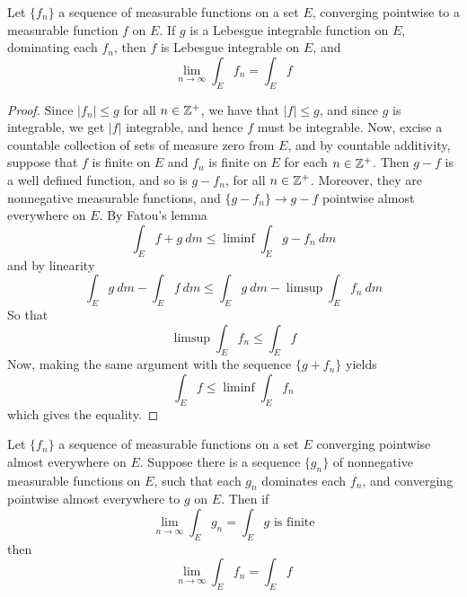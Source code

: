 \begin{theorem}\label{10.3.6}
    Let $\{f_n\}$ a sequence of measurable functions on a set $E$, converging
    pointwise to a measurable function  $f$ on  $E$. If  $g$ is a Lebesgue
    integrable function on  $E$, dominating each $f_n$, then $f$ is Lebesgue
    integrable on  $E$, and
    \begin{equation*}
        \lim_{n \xrightarrow{} \infty}{\int_E{f_n}}=\int_E{f}
    \end{equation*}
\end{theorem}
\begin{proof}
    Since $|f_n| \leq g$ for all  $n \in \mathbb{Z}^+$, we have that $|f| \leq g$, and
    since $g$ is integrable, we get  $|f|$ integrable, and hence  $f$ must be
    integrable. Now, excise a countable collection of sets of measure zero from
    $E$, and by countable additivity, suppose that  $f$ is finite on  $E$ and
    $f_n$ is finite on  $E$ for each  $n \in \mathbb{Z}^+$. Then  $g-f$ is a well
    defined function, and so is  $g-f_n$, for all  $n \in \mathbb{Z}^+$. Moreover, they
    are nonnegative measurable functions, and  $\{g-f_n\} \xrightarrow{} g-f$
    pointwise almost everywhere on $E$. By Fatou's lemma
    \begin{equation*}
        \int_E{f+g \ dm} \leq \liminf{\int_E{g-f_n \ dm}}
    \end{equation*}
    and by linearity
    \begin{equation*}
        \int_E{g \ dm}-\int_E{f \ dm} \leq
        \int_E{g \ dm}-\limsup{\int_E{f_n \ dm}}
    \end{equation*}
    So that
    \begin{equation*}
        \limsup{\int_E{f_n}} \leq \int_E{f}
    \end{equation*}
    Now, making the same argument with the sequence $\{g+f_n\}$ yields
    \begin{equation*}
        \int_E{f} \leq \liminf{\int_E{f_n}}
    \end{equation*}
    which gives the equality.
\end{proof}

\begin{theorem}\label{10.3.7}
    Let $\{f_n\}$ a sequence of measurable functions on a set $E$ converging
    pointwise almost everywhere on $E$. Suppose there is a sequence $\{g_n\}$ of
    nonnegative measurable functions on $E$, such that each  $g_n$ dominates
    each  $f_n$, and converging pointwise almost everywhere to $g$ on  $E$. Then
    if
    \begin{equation*}
        \lim_{n \xrightarrow{} \infty}{\int_E}{g_n}=\int_E{g} \text{ is finite}
    \end{equation*}
    then
    \begin{equation*}
        \lim_{n \xrightarrow{} \infty}{\int_E{f_n}}=\int_E{f}
    \end{equation*}
\end{theorem}
